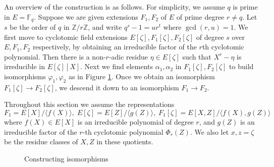\documentclass[12pt]{article}
\theoremstyle{plain}
\theoremstyle{definition}
\def\F{\ensuremath{\mathbb{F}}}
\begin{document}
An overview of the construction is as follows. For simplicity, we assume $q$ is prime in $E = 
\F_q$. Suppose we are given extensions $F_1, F_2$ of $E$ of prime degree $r \ne q$. Let $s$ be 
the order of $q$ in $\mathbb{Z} / r\mathbb{Z}$, and write $q^s - 1 = ur^t$ where $\gcd(r, u) = 1$. 
We first move to cyclotomic field extensions $E[\zeta], F_1[\zeta], F_2[\zeta]$ of degree $s$ over 
$E, F_1, F_2$ respectively, by obtaining an irreducible factor of the $r$th cyclotomic polynomial. 
Then there is a non-$r$-adic residue $\eta \in E[\zeta]$ such that $X^r - \eta$ is irreducible in 
$E[\zeta][X]$. Next we find elements $\alpha_1, \alpha_2$ in $F_1[\zeta], F_2[\zeta]$ to build 
isomorphisms $\varphi_1, \varphi_2$ as in Figure \ref{figure:isom1}. Once we obtain an isomorphism 
$F_1[\zeta] \rightarrow F_2[\zeta]$, we descend it down to an isomorphism $F_1 \rightarrow F_2$. 

Throughout this section we assume the representations
\begin{equation}
\label{equation:rep}
F_1 = E[X] / \langle f(X) \rangle, \; E[\zeta] = E[Z] / \langle g(Z) \rangle, \;
F_1[\zeta] = E[X, Z] / \langle f(X), g(Z) \rangle
\end{equation}
where $f(X) \in E[X]$ is an irreducible polynomial of degree $r$, and $g(Z)$ is an irreducible 
factor of the $r$-th cyclotomic polynomial $\Phi_r(Z)$. We also let $x, z = \zeta$ be the residue 
classes of $X, Z$ in these quotients.
\begin{figure}
	\begin{center}
		\caption{Constructing isomorphisms}
		\label{figure:isom1}
	\end{center}
\end{figure}
\end{document}
